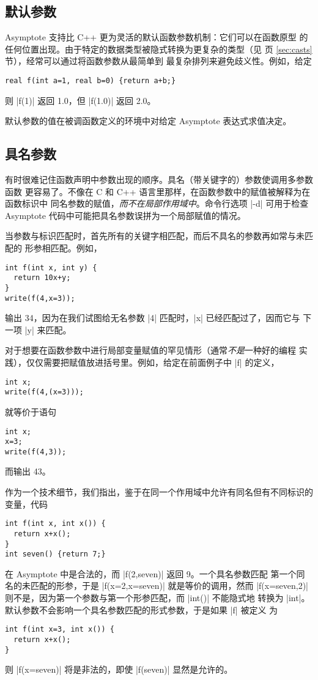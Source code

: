 \documentclass[nofonts,CJKnormalspaces]{ctexbook}[2009/05/20]
\newcommand*\prgname[1]{\textsf{#1}}
\begin{document}
{{{\subsection{默认参数}

\prgname{Asymptote} 支持比 C++ 更为灵活的默认函数参数机制：它们可以在函数原型
的任何位置出现。由于特定的数据类型被隐式转换为更复杂的类型（见
\pageref{sec:casts} 页 \ref{sec:casts} 节），经常可以通过将函数参数从最简单到
最复杂排列来避免歧义性。例如，给定
\begin{lstlisting}
real f(int a=1, real b=0) {return a+b;}
\end{lstlisting}
则 |f(1)| 返回 1.0，但 |f(1.0)| 返回 2.0。

默认参数的值在被调函数定义的环境中对给定 \prgname{Asymptote} 表达式求值决定。

\subsection{具名参数}

有时很难记住函数声明中参数出现的顺序。具名（带关键字的）参数使调用多参数函数
更容易了。不像在 C 和 C++ 语言里那样，在函数参数中的赋值被解释为在函数标识中
同名参数的赋值，\emph{而不在局部作用域中}。命令行选项 |-d| 可用于检查
\prgname{Asymptote} 代码中可能把具名参数误拼为一个局部赋值的情况。

当参数与标识匹配时，首先所有的关键字相匹配，而后不具名的参数再如常与未匹配的
形参相匹配。例如，
\begin{lstlisting}
int f(int x, int y) {
  return 10x+y;
}
write(f(4,x=3));
\end{lstlisting}
输出 34，因为在我们试图给无名参数 |4| 匹配时，|x| 已经匹配过了，因而它与
下一项 |y| 来匹配。

对于想要在函数参数中进行局部变量赋值的罕见情形（通常\emph{不是}一种好的编程
实践），仅仅需要把赋值放进括号里。例如，给定在前面例子中 |f| 的定义，
\begin{lstlisting}
int x;
write(f(4,(x=3)));
\end{lstlisting}
就等价于语句
\begin{lstlisting}
int x;
x=3;
write(f(4,3));
\end{lstlisting}
而输出 43。

作为一个技术细节，我们指出，鉴于在同一个作用域中允许有同名但有不同标识的
变量，代码
\begin{lstlisting}
int f(int x, int x()) {
  return x+x();
}
int seven() {return 7;}
\end{lstlisting}
在 \prgname{Asymptote} 中是合法的，而 |f(2,seven)| 返回 9。一个具名参数匹配
第一个同名的未匹配的形参，于是 |f(x=2,x=seven)| 就是等价的调用，然而
|f(x=seven,2)| 则不是，因为第一个参数与第一个形参匹配，而 |int()| 不能隐式地
转换为 |int|。默认参数不会影响一个具名参数匹配的形式参数，于是如果 |f| 被定义
为
\begin{lstlisting}
int f(int x=3, int x()) {
  return x+x();
}
\end{lstlisting}
则 |f(x=seven)| 将是非法的，即使 |f(seven)| 显然是允许的。

}}}
\end{document}
